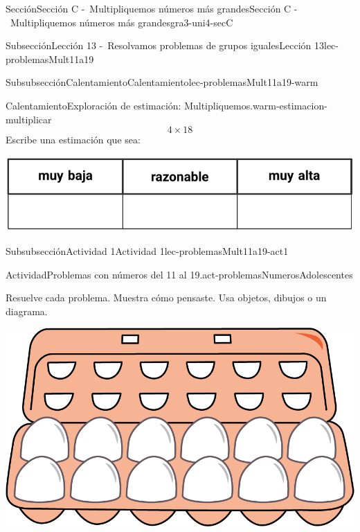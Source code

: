 \documentclass[twoside,10pt,]{article}
\begin{document}
\begin{sectionptx}{Sección}{Sección C -~Multipliquemos números más grandes}{}{Sección C -~Multipliquemos números más grandes}{}{}{gra3-uni4-secC}
\begin{subsectionptx}{Subsección}{Lección 13 -~Resolvamos problemas de grupos iguales}{}{Lección 13}{}{}{lec-problemasMult11a19}
\typeout{************************************************}
%
\begin{subsubsectionptx}{Subsubsección}{Calentamiento}{}{Calentamiento}{}{}{lec-problemasMult11a19-warm}
\begin{exploration}{Calentamiento}{Exploración de estimación: Multipliquemos.}{warm-estimacion-multiplicar}%
%
\begin{equation*}
4\times 18
\end{equation*}
Escribe una estimación que sea:%
\begin{image}{0}{1}{0}{}%
\includegraphics[width=\linewidth]{external/tikz-source/expolacionEstimacion-tab-gra3.pdf}
\end{image}%
\end{exploration}%
\end{subsubsectionptx}
%
%
\typeout{************************************************}
\typeout{************************************************}
%
\begin{subsubsectionptx}{Subsubsección}{Actividad 1}{}{Actividad 1}{}{}{lec-problemasMult11a19-act1}
\begin{activity}{Actividad}{Problemas con números del 11 al 19.}{act-problemasNumerosAdolescentes}%
\begin{sidebyside}{2}{0.05}{0.05}{0.1}%
\begin{sbspanel}{0.5}%
Resuelve cada problema. Muestra cómo pensaste. Usa objetos, dibujos o un diagrama.%
\end{sbspanel}%
\begin{sbspanel}{0.3}%
\includegraphics[width=\linewidth]{external/png-source/egg_carton.png}

\end{sbspanel}
\end{sidebyside}
\end{activity}
\end{subsubsectionptx}
\end{subsectionptx}
\end{sectionptx}
\end{document}

